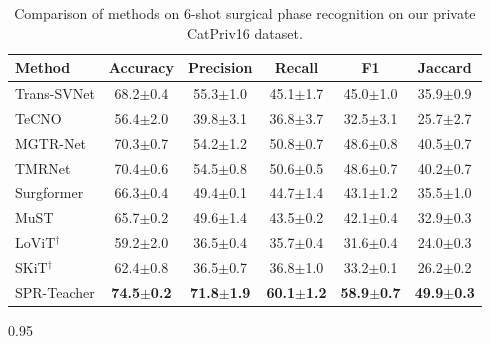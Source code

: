 \begin{table}[b]
\centering
\caption{Comparison of methods on 6-shot surgical phase recognition on our private CatPriv16 dataset.}
\label{tab:6shot_private}
\setlength{\tabcolsep}{4.0pt}
\footnotesize
\begin{tabular}{@{}l|ccccc@{}}
\toprule
\textbf{Method} & \textbf{Accuracy} & \textbf{Precision} & \textbf{Recall} & \textbf{F1} & \textbf{Jaccard} \\
\midrule
Trans-SVNet        & 68.2$\pm$0.4 & 55.3$\pm$1.0 & 45.1$\pm$1.7 & 45.0$\pm$1.0 & 35.9$\pm$0.9 \\
TeCNO              & 56.4$\pm$2.0 & 39.8$\pm$3.1 & 36.8$\pm$3.7 & 32.5$\pm$3.1 & 25.7$\pm$2.7 \\
MGTR-Net           & 70.3$\pm$0.7 & 54.2$\pm$1.2 & 50.8$\pm$0.7 & 48.6$\pm$0.8 & 40.5$\pm$0.7 \\
TMRNet             & 70.4$\pm$0.6 & 54.5$\pm$0.8 & 50.6$\pm$0.5 & 48.6$\pm$0.7 & 40.2$\pm$0.7 \\
Surgformer         & 66.3$\pm$0.4 & 49.4$\pm$0.1 & 44.7$\pm$1.4 & 43.1$\pm$1.2 & 35.5$\pm$1.0 \\
MuST               & 65.7$\pm$0.2 & 49.6$\pm$1.4 & 43.5$\pm$0.2 & 42.1$\pm$0.4 & 32.9$\pm$0.3 \\
LoViT$^\dagger$    & 59.2$\pm$2.0 & 36.5$\pm$0.4 & 35.7$\pm$0.4 & 31.6$\pm$0.4 & 24.0$\pm$0.3 \\
SKiT$^\dagger$     & 62.4$\pm$0.8 & 36.5$\pm$0.7 & 36.8$\pm$1.0 & 33.2$\pm$0.1 & 26.2$\pm$0.2 \\
\midrule
SPR-Teacher           & \textbf{74.5$\pm$0.2} & \textbf{71.8$\pm$1.9} & \textbf{60.1$\pm$1.2} & \textbf{58.9$\pm$0.7} & \textbf{49.9$\pm$0.3} \\
\bottomrule
\end{tabular}

\vspace{6pt}
\begin{spacing}{0.95}
\end{spacing}
\end{table}

